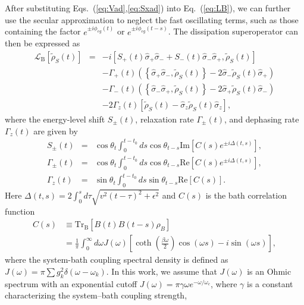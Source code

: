 \documentclass[english,nofootinbib, pra, twocolumn,superscriptaddress]{revtex4-1}
\begin{document}
After substituting Eqs.~(\ref{eq:Vad},\ref{eq:Sxad}) into Eq.~(\ref{eq:LB}),
we can further use the secular approximation to neglect the fast oscillating terms, such as those containing the factor
$e^{\pm i\phi_{eg}(t)}$ or $e^{\pm i\phi_{eg}(t-s)}$. The dissipation
superoperator can then be expressed as
\begin{eqnarray}
\mathcal{L}_{\text{B}}[\tilde{\rho}_{S}(t)] & = & -i\left[S_{+}(t)\hat{\sigma}_{+}\hat{\sigma}_{-}+S_{-}(t)\hat{\sigma}_{-}\hat{\sigma}_{+},\tilde{\rho}_{S}(t)\right]\nonumber \\
 &  & -\Gamma_{+}(t)\left(\left\{ \hat{\sigma}_{+}\hat{\sigma}_{-},\tilde{\rho}_{S}(t)\right\} -2\hat{\sigma}_{-}\tilde{\rho}_{S}(t)\hat{\sigma}_{+}\right)\nonumber \\
 &  & -\Gamma_{-}(t)\left(\left\{ \hat{\sigma}_{-}\hat{\sigma}_{+},\tilde{\rho}_{S}(t)\right\} -2\hat{\sigma}_{+}\tilde{\rho}_{S}(t)\hat{\sigma}_{-}\right)\nonumber \\
 &  & -2\Gamma_{z}(t)\left[\tilde{\rho}_{S}(t)-\hat{\sigma}_{z}\tilde{\rho}_{S}(t)\hat{\sigma}_{z}\right],\label{eq:LBLZ}
\end{eqnarray}
where the energy-level shift $S_{\pm}(t)$, relaxation rate $\Gamma_{\pm}(t)$,
and dephasing rate $\Gamma_{z}(t)$ are given by
\begin{eqnarray}
S_{\pm}(t) & = & \cos\theta_{t}\int_{0}^{t-t_{0}}ds\cos\theta_{t-s}\text{Im}[C(s)e^{\pm i\Delta(t,s)}],\label{eq:Spm}\\
\Gamma_{\pm}(t) & = & \cos\theta_{t}\int_{0}^{t-t_{0}}ds\cos\theta_{t-s}\text{Re}[C(s)e^{\pm i\Delta(t,s)}],\label{eq:G+-}\\
\Gamma_{z}(t) & = & \sin\theta_{t}\int_{0}^{t-t_{0}}ds\sin\theta_{t-s}\text{Re}[C(s)].\label{eq:Gz}
\end{eqnarray}
Here $\Delta(t,s)=2\int_{0}^{s}d\tau\sqrt{v^{2}(t-\tau)^{2}+\epsilon^{2}}$
and $C(s)$ is the bath correlation function
\begin{align}
C(s) & \equiv\textrm{Tr}_{\text{B}}[B(t)B(t-s)\rho_{B}]\nonumber \\
 & =\frac{1}{\pi}\int_{0}^{\infty}d\omega J(\omega)\left[\coth\left(\frac{\beta\omega}{2}\right)\cos(\omega s)-i\sin(\omega s)\right],\label{eq:cs1}
\end{align}
where the system-bath coupling spectral density is defined as $J(\omega)=\pi\sum g_{k}^{2}\delta(\omega-\omega_{k})$.
In this work, we assume that $J(\omega)$ is an Ohmic spectrum with an
exponential cutoff $J(\omega)=\pi\gamma\omega e^{-\omega/\omega_{c}}$, where
$\gamma$ is a constant characterizing the system--bath coupling strength,
\end{document}
